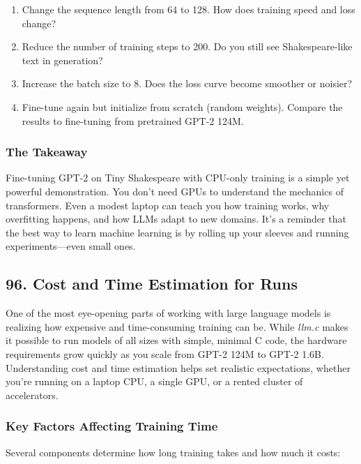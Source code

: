 \documentclass[
  letterpaper,
  DIV=11,
  numbers=noendperiod]{scrreprt}
\providecommand{\tightlist}{%
  \setlength{\itemsep}{0pt}\setlength{\parskip}{0pt}}
\begin{document}
\begin{enumerate}
\def\labelenumi{\arabic{enumi}.}
\tightlist
\item
  Change the sequence length from 64 to 128. How does training speed and
  loss change?
\item
  Reduce the number of training steps to 200. Do you still see
  Shakespeare-like text in generation?
\item
  Increase the batch size to 8. Does the loss curve become smoother or
  noisier?
\item
  Fine-tune again but initialize from scratch (random weights). Compare
  the results to fine-tuning from pretrained GPT-2 124M.
\end{enumerate}

\subsubsection{The Takeaway}\label{the-takeaway-84}

Fine-tuning GPT-2 on Tiny Shakespeare with CPU-only training is a simple
yet powerful demonstration. You don't need GPUs to understand the
mechanics of transformers. Even a modest laptop can teach you how
training works, why overfitting happens, and how LLMs adapt to new
domains. It's a reminder that the best way to learn machine learning is
by rolling up your sleeves and running experiments---even small ones.

\subsection{96. Cost and Time Estimation for
Runs}\label{cost-and-time-estimation-for-runs}

One of the most eye-opening parts of working with large language models
is realizing how expensive and time-consuming training can be. While
\emph{llm.c} makes it possible to run models of all sizes with simple,
minimal C code, the hardware requirements grow quickly as you scale from
GPT-2 124M to GPT-2 1.6B. Understanding cost and time estimation helps
set realistic expectations, whether you're running on a laptop CPU, a
single GPU, or a rented cluster of accelerators.

\subsubsection{Key Factors Affecting Training
Time}\label{key-factors-affecting-training-time}

Several components determine how long training takes and how much it
costs:
\end{document}
